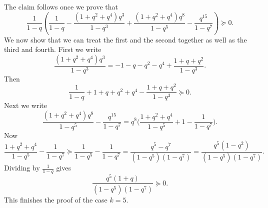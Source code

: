 \documentclass[12pt,reqno]{amsart}
\renewcommand{\(}{\left\(}
\renewcommand{\)}{\right\)}
\numberwithin{equation}{section}
\theoremstyle{plain}
\theoremstyle{definition}
\numberwithin{equation}{section}
\begin{document}
The claim follows once we prove that
\begin{equation*}
\frac{1}{1-q}\left(\frac{1}{1-q}-\frac{\left(1+q^2+q^4\right)q^3}{1-q^3}+\frac{\left(1+q^2+q^4\right)q^8}{1-q^5}-\frac{q^{15}}{1-q^7}\right) \succeq 0.
\end{equation*}
We now show that we can treat the first and the second together as well as the third and fourth. First we write
\begin{equation*}
\frac{\left(1+q^2+q^4\right)q^3}{1-q^3} = -1-q-q^2-q^4+\frac{1+q+q^2}{1-q^3}.
\end{equation*}
Then
\begin{equation*}
\frac{1}{1-q} + 1 + q + q^2 + q^4 - \frac{1+q+q^2}{1-q^3} \succeq 0.
\end{equation*}
Next we write
\begin{equation*}
\frac{\left(1+q^2+q^4\right)q^8}{1-q^5} - \frac{q^{15}}{1-q^7} = q^8 \bigg(\frac{1+q^2+q^4}{1-q^5}+1-\frac{1}{1-q^7}\bigg).
\end{equation*}
Now
\begin{equation*}
\frac{1+q^2+q^4}{1-q^5} - \frac{1}{1-q^7} \succeq \frac{1}{1-q^5} - \frac{1}{1-q^7} = \frac{q^5-q^7}{\left(1-q^5\right)\left(1-q^7\right)} = \frac{q^5\left(1-q^2\right)}{\left(1-q^5\right)\left(1-q^7\right)}.
\end{equation*}
Dividing by $\frac{1}{1-q}$ gives
\begin{equation*}
\frac{q^5(1+q)}{(1-q^5)(1-q^7)} \succeq 0.
\end{equation*}
This finishes the proof of the case $k=5$. 
\end{document}
